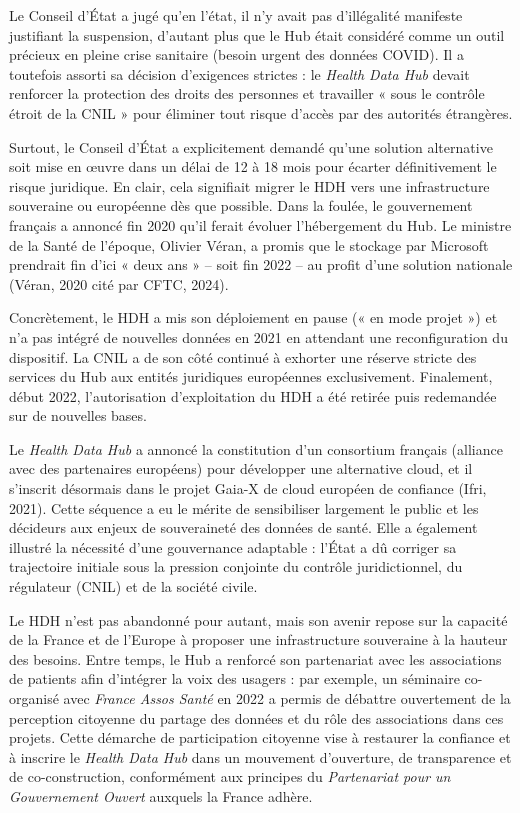 \documentclass[10pt,a4paper]{article} %
\begin{document}
Le Conseil d’État a jugé qu’en l’état, il n’y avait pas d’illégalité manifeste justifiant la suspension, d’autant plus que le Hub était considéré comme un outil précieux en pleine crise sanitaire (besoin urgent des données COVID). Il a toutefois assorti sa décision d’exigences strictes : le \textit{Health Data Hub} devait renforcer la protection des droits des personnes et travailler « sous le contrôle étroit de la CNIL » pour éliminer tout risque d’accès par des autorités étrangères.

Surtout, le Conseil d’État a explicitement demandé qu’une solution alternative soit mise en œuvre dans un délai de 12 à 18 mois pour écarter définitivement le risque juridique. En clair, cela signifiait migrer le HDH vers une infrastructure souveraine ou européenne dès que possible. Dans la foulée, le gouvernement français a annoncé fin 2020 qu’il ferait évoluer l’hébergement du Hub. Le ministre de la Santé de l’époque, Olivier Véran, a promis que le stockage par Microsoft prendrait fin d’ici « deux ans » – soit fin 2022 – au profit d’une solution nationale (Véran, 2020 cité par CFTC, 2024).

Concrètement, le HDH a mis son déploiement en pause (« en mode projet ») et n’a pas intégré de nouvelles données en 2021 en attendant une reconfiguration du dispositif. La CNIL a de son côté continué à exhorter une réserve stricte des services du Hub aux entités juridiques européennes exclusivement. Finalement, début 2022, l’autorisation d’exploitation du HDH a été retirée puis redemandée sur de nouvelles bases.

Le \textit{Health Data Hub} a annoncé la constitution d’un consortium français (alliance avec des partenaires européens) pour développer une alternative cloud, et il s’inscrit désormais dans le projet Gaia-X de cloud européen de confiance (Ifri, 2021). Cette séquence a eu le mérite de sensibiliser largement le public et les décideurs aux enjeux de souveraineté des données de santé. Elle a également illustré la nécessité d’une gouvernance adaptable : l’État a dû corriger sa trajectoire initiale sous la pression conjointe du contrôle juridictionnel, du régulateur (CNIL) et de la société civile.

Le HDH n’est pas abandonné pour autant, mais son avenir repose sur la capacité de la France et de l’Europe à proposer une infrastructure souveraine à la hauteur des besoins. Entre temps, le Hub a renforcé son partenariat avec les associations de patients afin d’intégrer la voix des usagers : par exemple, un séminaire co-organisé avec \textit{France Assos Santé} en 2022 a permis de débattre ouvertement de la perception citoyenne du partage des données et du rôle des associations dans ces projets. Cette démarche de participation citoyenne vise à restaurer la confiance et à inscrire le \textit{Health Data Hub} dans un mouvement d’ouverture, de transparence et de co-construction, conformément aux principes du \textit{Partenariat pour un Gouvernement Ouvert} auxquels la France adhère.
\end{document}
